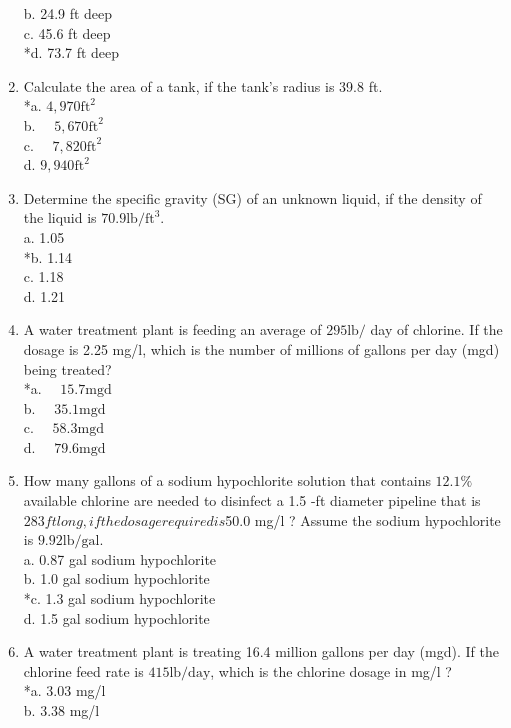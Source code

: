 \begin{enumerate}
b. 24.9 ft deep\\
c. 45.6 ft deep\\
*d. 73.7 ft deep\\
  \item Calculate the area of a tank, if the tank's radius is 39.8 ft.\\
*a. $4,970 \mathrm{ft}^{2}$\\
b. $\quad 5,670 \mathrm{ft}^{2}$\\
c. $\quad 7,820 \mathrm{ft}^{2}$\\
d. $9,940 \mathrm{ft}^{2}$\\
  \item Determine the specific gravity (SG) of an unknown liquid, if the density of the liquid is $70.9 \mathrm{lb} / \mathrm{ft}^{3}$.\\
a. 1.05 \\
*b. 1.14 \\
c. 1.18 \\
d. 1.21 \\
  \item A water treatment plant is feeding an average of $295 \mathrm{lb} /$ day of chlorine. If the dosage is 2.25 mg/l, which is the number of millions of gallons per day (mgd) being treated?\\
*a. $\quad 15.7 \mathrm{mgd}$\\
b. $\quad 35.1 \mathrm{mgd}$\\
c. $\quad 58.3 \mathrm{mgd}$\\
d. $\quad 79.6 \mathrm{mgd}$\\
  \item How many gallons of a sodium hypochlorite solution that contains $12.1 \%$ available chlorine are needed to disinfect a 1.5 -ft diameter pipeline that is $283 ft long, if the dosage required is $50.0 mg/l ? Assume the sodium hypochlorite is $9.92 \mathrm{lb} / \mathrm{gal}$.\\
a. 0.87 gal sodium hypochlorite\\
b. 1.0 gal sodium hypochlorite\\
*c. 1.3 gal sodium hypochlorite\\
d. 1.5 gal sodium hypochlorite \\
\item A water treatment plant is treating 16.4 million gallons per day (mgd). If the chlorine feed rate is $415 \mathrm{lb} / \mathrm{day}$, which is the chlorine dosage in mg/l ?\\
*a. 3.03 mg/l\\
b. 3.38 mg/l\\

\end{enumerate}
